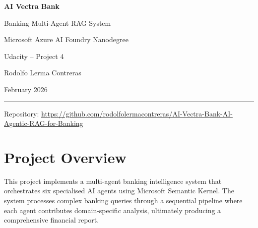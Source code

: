 \documentclass[12pt,a4paper]{article}
\begin{document}
\begin{titlepage}
\centering
\vspace*{2cm}

{\Huge\bfseries AI Vectra Bank\par}
\vspace{0.5cm}
{\LARGE Banking Multi-Agent RAG System\par}
\vspace{1.5cm}
{\Large\color{sectionblue} Microsoft Azure AI Foundry Nanodegree\par}
{\large Udacity -- Project 4\par}
\vspace{2cm}
{\large Rodolfo Lerma Contreras\par}
\vspace{0.5cm}
{\large February 2026\par}
\vspace{2cm}

\noindent\rule{0.8\textwidth}{0.4pt}
\vspace{0.5cm}

{\normalsize
Repository: \url{https://github.com/rodolfolermacontreras/AI-Vectra-Bank-AI-Agentic-RAG-for-Banking}\par
}

\vfill
\end{titlepage}

\tableofcontents
\newpage

\section{Project Overview}

This project implements a multi-agent banking intelligence system that
orchestrates six specialised AI agents using Microsoft Semantic Kernel.
The system processes complex banking queries through a sequential pipeline
where each agent contributes domain-specific analysis, ultimately producing
a comprehensive financial report.
\end{document}
